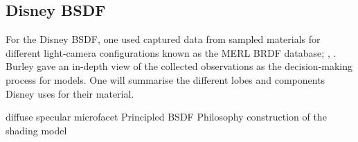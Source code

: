 \subsection{Disney BSDF}

For the Disney BSDF, one used captured data from sampled materials for different light-camera configurations known as the MERL BRDF database; \cite{matusik_data-driven_2003}, \cite{burley_physically_2012}.
Burley gave an in-depth view of the collected observations as the decision-making process for models.
One will summarise the different lobes and components Disney uses for their material.







diffuse
specular
microfacet
Principled BSDF
Philosophy
construction of the shading model

